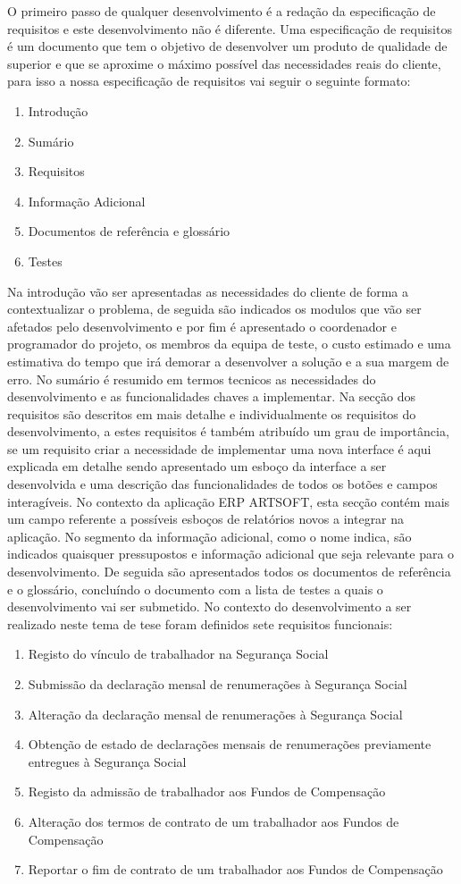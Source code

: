 \documentclass[sigplan]{acmart}
\begin{document}
O primeiro passo de qualquer desenvolvimento é a redação da especificação de requisitos e este desenvolvimento não é diferente. Uma especificação de requisitos é um documento que tem o objetivo de desenvolver um produto de qualidade de superior e que se aproxime o máximo possível das necessidades reais do cliente, para isso a nossa especificação de requisitos vai seguir o seguinte formato:
\begin{enumerate}
  \item Introdução
  \item Sumário
  \item Requisitos
  \item Informação Adicional
  \item Documentos de referência e glossário
  \item Testes
\end{enumerate}
Na introdução vão ser apresentadas as necessidades do cliente de forma a contextualizar o problema, de seguida são indicados os modulos que vão ser afetados pelo desenvolvimento e por fim é apresentado o coordenador e programador do projeto, os membros da equipa de teste, o custo estimado e uma estimativa do tempo que irá demorar a desenvolver a solução e a sua margem de erro. No sumário é resumido em termos tecnicos as necessidades do desenvolvimento e as funcionalidades chaves a implementar. Na secção dos requisitos são descritos em mais detalhe e individualmente os requisitos do desenvolvimento, a estes requisitos é também atribuído um grau de importância, se um requisito criar a necessidade de implementar uma nova interface é aqui explicada em detalhe sendo apresentado um esboço da interface a ser desenvolvida e uma descrição das funcionalidades de todos os botões e campos interagíveis. No contexto da aplicação ERP ARTSOFT, esta secção contém mais um campo referente a possíveis esboços de relatórios novos a integrar na aplicação. No segmento da informação adicional, como o nome indica, são indicados quaisquer pressupostos e informação adicional que seja relevante para o desenvolvimento. De seguida são apresentados todos os documentos de referência e o glossário, concluíndo o documento com a lista de testes a quais o desenvolvimento vai ser submetido. No contexto do desenvolvimento a ser realizado neste tema de tese foram definidos sete requisitos funcionais:
\begin{enumerate}
  \item Registo do vínculo de trabalhador na Segurança Social
  \item Submissão da declaração mensal de renumerações à Segurança Social
  \item Alteração da declaração mensal de renumerações à Segurança Social
  \item Obtenção de estado de declarações mensais de renumerações previamente entregues à Segurança Social
  \item Registo da admissão de trabalhador aos Fundos de Compensação
  \item Alteração dos termos de contrato de um trabalhador aos Fundos de Compensação
  \item Reportar o fim de contrato de um trabalhador aos Fundos de Compensação
\end{enumerate}
\end{document}
